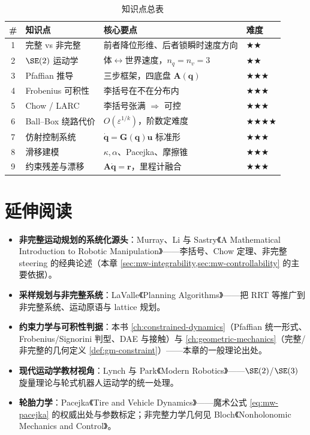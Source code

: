 \begin{table}[H]\centering\small
\caption{知识点总表}
\begin{tabular}{clll}
\toprule
\# & 知识点 & 核心要点 & 难度 \\
\midrule
1 & 完整 vs 非完整 & 前者降位形维、后者锁瞬时速度方向 & $\bigstar\bigstar$ \\
2 & $\SE(2)$ 运动学 & 体$\leftrightarrow$世界速度，$n_q=n_v=3$ & $\bigstar\bigstar$ \\
3 & Pfaffian 推导 & 三步框架，四底盘 $\mathbf{A}(\mathbf{q})$ & $\bigstar\bigstar\bigstar$ \\
4 & Frobenius 可积性 & 李括号在不在分布内 & $\bigstar\bigstar\bigstar$ \\
5 & Chow / LARC & 李括号张满 $\Rightarrow$ 可控 & $\bigstar\bigstar\bigstar$ \\
6 & Ball--Box 绕路代价 & $O(\varepsilon^{1/k})$，阶数定难度 & $\bigstar\bigstar\bigstar\bigstar$ \\
7 & 仿射控制系统 & $\dot{\mathbf{q}}=\mathbf{G}(\mathbf{q})\mathbf{u}$ 标准形 & $\bigstar\bigstar\bigstar$ \\
8 & 滑移建模 & $\kappa,\alpha$、Pacejka、摩擦锥 & $\bigstar\bigstar\bigstar$ \\
9 & 约束残差与漂移 & $\mathbf{A}\dot{\mathbf{q}}=\mathbf{r}$，里程计融合 & $\bigstar\bigstar\bigstar$ \\
\bottomrule
\end{tabular}
\end{table}

\section*{延伸阅读}
\begin{itemize}
  \item \textbf{非完整运动规划的系统化源头}：Murray、Li 与 Sastry《A Mathematical Introduction to Robotic Manipulation》\cite{murray1994mathematical}——李括号、Chow 定理、非完整 steering 的经典论述（本章 \cref{sec:mw-integrability,sec:mw-controllability} 的主要依据）。
  \item \textbf{采样规划与非完整系统}：LaValle《Planning Algorithms》\cite{lavalle2006planning}——把 RRT 等推广到非完整系统、运动原语与 lattice 规划。
  \item \textbf{约束力学与可积性判据}：本书 \cref{ch:constrained-dynamics}（Pfaffian 统一形式、Frobenius/Signorini 判型、DAE 与接触）与 \cref{ch:geometric-mechanics}（完整/非完整的几何定义 \cref{def:gm-constraint}）——本章的一般理论出处。
  \item \textbf{现代运动学教材视角}：Lynch 与 Park《Modern Robotics》\cite{lynch2017modern}——$\SE(2)$/$\SE(3)$ 旋量理论与轮式机器人运动学的统一处理。
  \item \textbf{轮胎力学}：Pacejka《Tire and Vehicle Dynamics》\cite{pacejka2012tire}——魔术公式 \cref{eq:mw-pacejka} 的权威出处与参数标定；非完整力学几何见 Bloch《Nonholonomic Mechanics and Control》\cite{bloch2015nonholonomic}。
\end{itemize}


